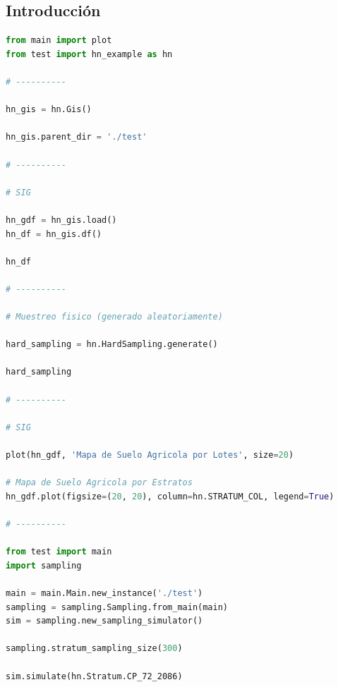 \subsection{Introducción}

\begin{lstlisting}[language=Python, caption=Introducción al enunciados del problema]
from main import plot
from test import hn_example as hn

# ----------

hn_gis = hn.Gis()

hn_gis.parent_dir = './test'

# ----------

# SIG

hn_gdf = hn_gis.load()
hn_df = hn_gis.df()

hn_df

# ----------

# Muestreo fisico (generado aleatoriamente)

hard_sampling = hn.HardSampling.generate()

hard_sampling

# ----------

# SIG

plot(hn_gdf, 'Mapa de Suelo Agricola por Lotes', size=20)

# Mapa de Suelo Agricola por Estratos
hn_gdf.plot(figsize=(20, 20), column=hn.STRATUM_COL, legend=True)

# ----------

from test import main
import sampling

main = main.Main.new_instance('./test')
sampling = sampling.Sampling.from_main(main)
sim = sampling.new_sampling_simulator()

sampling.stratum_sampling_size(300)

sim.simulate(hn.Stratum.CP_72_2086)
\end{lstlisting}

